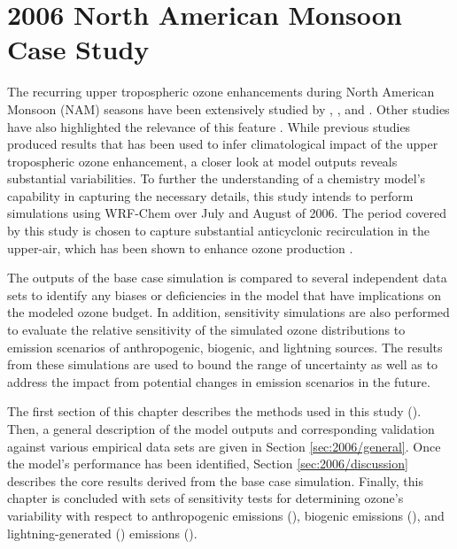 \chapter{2006 North American Monsoon Case Study} \label{ch:2006}

\ifpdf
    \graphicspath{{Chapter_2006/figures/PNG/}{Chapter_2006/figures/PDF/}{Chapter_2006/figures/}}
\else
    \graphicspath{{Chapter_2006/figures/EPS/}{Chapter_2006/figures/}}
\fi

The recurring upper tropospheric ozone enhancements during North American Monsoon (NAM) seasons have been extensively studied by \citet{Li:2005ss}, \citet{Cooper:2006dq,Cooper:2007cr,Cooper:2009nx}, and \citet{Barth:2012qf}. Other studies have also highlighted the relevance of this feature \citep[e.g.][]{Hudman:2007fu,Choi:2009bh,Jourdain:2010tw}. While previous studies produced results that has been used to infer climatological impact of the upper tropospheric ozone enhancement, a closer look at model outputs reveals substantial variabilities. To further the understanding of a chemistry model's capability in capturing the necessary details, this study intends to perform simulations using WRF-Chem \citet{Grell:2005fv} over July and August of 2006. The period covered by this study is chosen to capture substantial anticyclonic recirculation in the upper-air, which has been shown to enhance ozone production \citet{Cooper:2007cr}.

The outputs of the base case simulation is compared to several independent data sets to identify any biases or deficiencies in the model that have implications on the modeled ozone budget. In addition, sensitivity simulations are also performed to evaluate the relative sensitivity of the simulated ozone distributions to emission scenarios of anthropogenic, biogenic, and lightning sources. The results from these simulations are used to bound the range of uncertainty as well as to address the impact from potential changes in emission scenarios in the future.

The first section of this chapter describes the methods used in this study (). Then, a general description of the model outputs and corresponding validation against various empirical data sets are given in Section \ref{sec:2006/general}. Once the model's performance has been identified, Section \ref{sec:2006/discussion} describes the core results derived from the base case simulation. Finally, this chapter is concluded with sets of sensitivity tests for determining ozone's variability with respect to anthropogenic emissions (), biogenic emissions (), and lightning-generated  (\lnox) emissions ().

